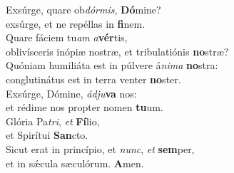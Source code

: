 \oddverse Exsúrge, quare ob\textit{dór}\textit{mis}, \textbf{Dó}mine?~\*\\
\oddverse exsúrge, et ne repéllas in \textbf{fi}nem.\\
\evenverse Quare fáciem tu\textit{am} \textit{a}\textbf{vér}tis,~\*\\
\evenverse oblivísceris inópiæ nostræ, et tribulatiónis \textbf{no}stræ?\\
\oddverse Quóniam humiliáta est in púlvere á\textit{ni}\textit{ma} \textbf{no}stra:~\*\\
\oddverse conglutinátus est in terra venter \textbf{no}ster.\\
\evenverse Exsúrge, Dómine, \textit{ád}\textit{ju}\textbf{va} nos:~\*\\
\evenverse et rédime nos propter nomen \textbf{tu}um.\\
\oddverse Glória Pa\textit{tri}, \textit{et} \textbf{Fí}lio,~\*\\
\oddverse et Spirítui \textbf{San}cto.\\
\evenverse Sicut erat in princípio, et \textit{nunc}, \textit{et} \textbf{sem}per,~\*\\
\evenverse et in sǽcula sæculórum. \textbf{A}men.\\
